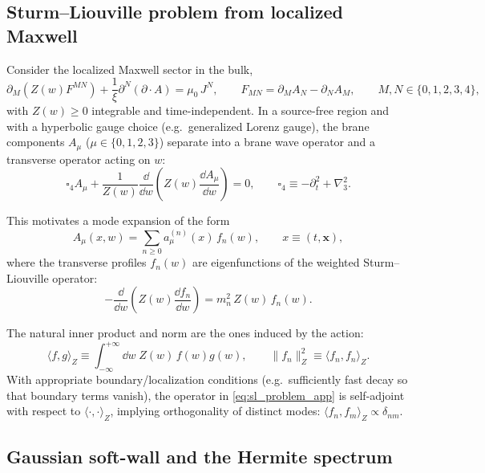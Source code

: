 \documentclass[11pt]{article}
\newcommand{\Z}{Z}              %
\begin{document}
\subsection{Sturm--Liouville problem from localized Maxwell}
\label{app:sl_from_localized_maxwell}

Consider the localized Maxwell sector in the bulk,
\begin{equation}
\partial_M\!\left(\Z(w)F^{MN}\right) + \frac{1}{\xi}\partial^N(\partial\!\cdot\!A)
= \mu_0\,J^N,
\qquad
F_{MN}=\partial_M A_N-\partial_N A_M,
\qquad
M,N\in\{0,1,2,3,4\},
\end{equation}
with \(\Z(w)\ge 0\) integrable and time-independent. In a source-free region and with
a hyperbolic gauge choice (e.g.\ generalized Lorenz gauge), the brane components
\(A_\mu\) (\(\mu\in\{0,1,2,3\}\)) separate into a brane wave operator and a transverse
operator acting on \(w\):
\begin{equation}
\square_4 A_\mu + \frac{1}{\Z(w)}\frac{\dd}{\dd w}\!\left(\Z(w)\frac{\dd A_\mu}{\dd w}\right)
= 0,
\qquad
\square_4\equiv -\partial_t^2+\nabla_3^2.
\label{eq:w_operator_separation}
\end{equation}

This motivates a mode expansion of the form
\begin{equation}
A_\mu(x,w)=\sum_{n\ge 0} a_\mu^{(n)}(x)\,f_n(w),
\qquad x\equiv (t,\mathbf{x}),
\label{eq:kk_expansion_app}
\end{equation}
where the transverse profiles \(f_n(w)\) are eigenfunctions of the weighted
Sturm--Liouville operator:
\begin{equation}
-\frac{\dd}{\dd w}\!\left(\Z(w)\frac{\dd f_n}{\dd w}\right)=m_n^2\,\Z(w)\,f_n(w).
\label{eq:sl_problem_app}
\end{equation}

The natural inner product and norm are the ones induced by the action:
\begin{equation}
\langle f,g\rangle_{\Z}\equiv \int_{-\infty}^{+\infty}\dd w\;\Z(w)\,f(w)g(w),
\qquad
\|f_n\|_{\Z}^2 \equiv \langle f_n,f_n\rangle_{\Z}.
\label{eq:Z_inner_product_app}
\end{equation}
With appropriate boundary/localization conditions (e.g.\ sufficiently fast decay so that
boundary terms vanish), the operator in \eqref{eq:sl_problem_app} is self-adjoint with
respect to \(\langle\cdot,\cdot\rangle_{\Z}\), implying orthogonality of distinct modes:
\(\langle f_n,f_m\rangle_{\Z}\propto \delta_{nm}\).

\subsection{Gaussian soft-wall and the Hermite spectrum}
\label{app:hermite_soft_wall}
\end{document}
